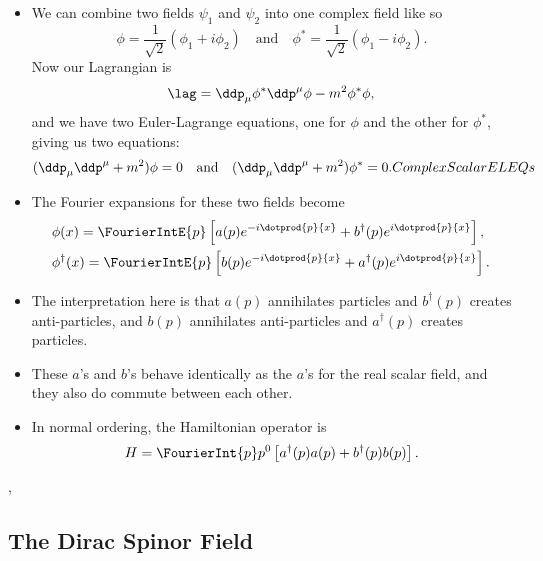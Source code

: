\begin{itemize}
    \item We can combine two fields $\psi_1$ and $\psi_2$ into one complex field like so
        \begin{equation*}
            \phi = \frac{1}{\sqrt{2}} (\phi_1 + i\phi_2) \quad \mathrm{and} \quad \phi^* = \frac{1}{\sqrt{2}} (\phi_1 - i\phi_2).
        \end{equation*}
        Now our Lagrangian is
        \begin{equation}
            \lag = \ddp_{\mu}\phi^*\ddp^{\mu}\phi - m^2\phi^*\phi,\label{ComplexScalarLag}
        \end{equation}
        and we have two Euler-Lagrange equations, one for $\phi$ and the other for $\phi^*$, giving us two equations:
        \begin{equation}
            (\ddp_{\mu}\ddp^{\mu} + m^2)\phi = 0 \quad \mathrm{and} \quad (\ddp_{\mu}\ddp^{\mu} + m^2)\phi^* = 0.{ComplexScalarELEQs}
        \end{equation}
    \item The Fourier expansions for these two fields become
        \begin{align}
            &\phi(x) = \FourierIntE{p} \left[ a(p)e^{-i\dotprod{p}{x}} + b^{\dagger}(p)e^{i\dotprod{p}{x}} \right],\label{ComplexScalarFourierExp} \\
            &\phi^{\dagger}(x) = \FourierIntE{p} \left[ b(p)e^{-i\dotprod{p}{x}} + a^{\dagger}(p)e^{i\dotprod{p}{x}} \right].\label{ComplexScalarFourierExpConj}
        \end{align}
    \item The interpretation here is that $a(p)$ annihilates particles and $b^{\dagger}(p)$ creates anti-particles, and $b(p)$ annihilates anti-particles and $a^{\dagger}(p)$ creates particles.
    \item These $a$'s and $b$'s behave identically as the $a$'s for the real scalar field, and they also do commute between each other.
    \item In normal ordering, the Hamiltonian operator is 
        \begin{equation}
            H = \FourierInt{p} p^0 \left[ a^{\dagger}(p)a(p) + b^{\dagger}(p)b(p) \right].
        \end{equation}
\end{itemize}


\sep


\subsection*{The Dirac Spinor Field}

